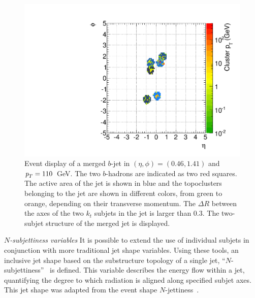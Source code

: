 \begin{figure}[tp]
\centering
\includegraphics[width=1\textwidth]{FIGS/TEMPFigs/EventDisplay7023Cluster_Bs.pdf}
\caption{Event display of a merged $b$-jet in $(\eta,\phi)=(0.46,1.41)$ and ${\emph{p}_{T}} = 110$~GeV. The two $b$-hadrons are indicated as two red squares. The active area of the jet is shown in blue and the topoclusters belonging to the jet are shown in different colors, from green to orange, depending on their transverse momentum. The $\Delta R$ between the axes of the two $k_t$ subjets in the jet is larger than 0.3. The two-subjet structure of the merged jet is displayed.}
\label{fig:ED}
\end{figure}



{ \em $N$-subjettiness variables} It is possible to extend the use of individual subjets in conjunction with more traditional jet shape variables. Using these tools, an inclusive jet shape based on the substructure topology of a single jet, ``$N$-subjettiness''~\cite{nsubjettiness} is defined. This variable describes the energy flow within a jet, quantifying the degree to which radiation is aligned along specified subjet axes. This jet shape was adapted from the event shape $N$-jettiness~\cite{njetti}.

